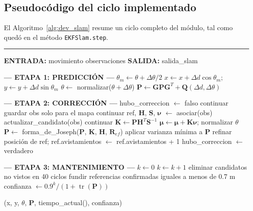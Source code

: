 \subsection{Pseudocódigo del ciclo implementado}

El Algoritmo~\ref{alg:dev_slam} resume un ciclo completo del módulo, tal como quedó en
el método \texttt{EKFSlam.step}.

\begin{center}
\label{alg:dev_slam}
\end{center}
\vspace{-1.8cm}
\rule{\textwidth}{0.4pt}
\vspace{-0.9cm}
\begin{algorithmic}[1]

\Statex \textbf{ENTRADA:}
\Statex movimiento 
\Statex observaciones 
\Statex \textbf{SALIDA:}
\Statex salida\_slam 

\Statex
\Statex \textbf{--- ETAPA 1: PREDICCIÓN ---}
\State $\theta_m \gets \theta + \Delta\theta / 2$
\State $x \gets x + \Delta d \cos\theta_m$;\; $y \gets y + \Delta d \sin\theta_m$
\State $\theta \gets$ normalizar($\theta + \Delta\theta$)
\State $\mathbf{P} \gets \mathbf{G}\mathbf{P}\mathbf{G}^T + \mathbf{Q}(\Delta d, \Delta\theta)$

\Statex
\Statex \textbf{--- ETAPA 2: CORRECCIÓN ---}
\State hubo\_correccion $\gets$ falso
        \State continuar
    \EndIf
        \State guardar obs solo para el mapa
        \State continuar
    \EndIf
    \State ref, $\mathbf{H}$, $\mathbf{S}$, $\boldsymbol{\nu}$ $\gets$
    asociar(obs) 
            \State actualizar\_candidato(obs) 
        \EndIf
        \State continuar
    \EndIf
    \State $\mathbf{K} \gets \mathbf{P}\mathbf{H}^T\mathbf{S}^{-1}$
    \State $\boldsymbol{\mu} \gets \boldsymbol{\mu} + \mathbf{K}\boldsymbol{\nu}$;\;
    normalizar $\theta$
    \State $\mathbf{P} \gets$ forma\_de\_Joseph($\mathbf{P}$, $\mathbf{K}$, $\mathbf{H}$, $\mathbf{R}_{ef}$)
    \State aplicar varianza mínima a $\mathbf{P}$
    \State refinar posición de ref;\; ref.avistamientos $\gets$ ref.avistamientos + 1
    \State hubo\_correccion $\gets$ verdadero
\EndFor

\Statex
\Statex \textbf{--- ETAPA 3: MANTENIMIENTO ---}
    \State $k \gets 0$
\Else
    \State $k \gets k + 1$ 
\EndIf
\State eliminar candidatos no vistos en 40 ciclos
\State fundir referencias confirmadas iguales a menos de 0.7 m
\State confianza $\gets 0.9^{k} / (1 + \operatorname{tr}(\mathbf{P}))$

\Statex
\State \Return (x, y, $\theta$, $\mathbf{P}$, tiempo\_actual(), confianza)

\end{algorithmic}

